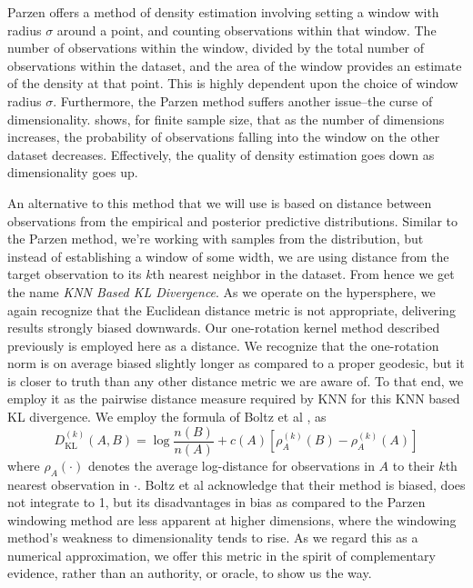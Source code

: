 Parzen \cite{parzen1962} offers a method of density estimation involving setting a window with
  radius $\sigma$ around a point, and counting observations within that window.  The number of
  observations within the window, divided by the total number of observations within the dataset,
  and the area of the window provides an estimate of the density at that point. This is highly
  dependent upon the choice of window radius $\sigma$.  Furthermore, the Parzen method suffers
  another issue--the curse of dimensionality.  \cite{boltz2009} shows, for finite sample size, that
  as the number of dimensions increases, the probability of observations falling into the window on
  the other dataset decreases. Effectively, the quality of density estimation goes down as
  dimensionality goes up.

An alternative to this method that we will use is based on distance between observations from the
  empirical and posterior predictive distributions.  Similar to the Parzen method, we're working
  with samples from the distribution, but instead of establishing a window of some width, we are
  using distance from the target observation to its $k$th nearest neighbor in the dataset.
  From hence we get the name \emph{KNN Based KL Divergence}.  As we operate on the hypersphere,
  we again recognize that the Euclidean distance metric is not appropriate, delivering results strongly
  biased downwards.  Our one-rotation kernel method described previously is employed here as a
  distance.  We recognize that the one-rotation norm is on average biased slightly longer as
  compared to a proper geodesic, but it is closer to truth than any other distance metric we are
  aware of.  To that end, we employ it as the pairwise distance measure required by KNN for this KNN
  based KL divergence.  We employ the formula of Boltz et al \cite{boltz2009}, as
  \begin{equation}
    \label{eqn:knnkld}
    D_{\text{KL}}^{(k)}(A,B) = \log\frac{n(B)}{n(A)} + c(A) \left[\rho_A^{(k)}(B)
                                                                      - \rho_A^{(k)}(A)\right]
  \end{equation}
  where $\rho_A(\cdot)$ denotes the average log-distance for observations in $A$ to their $k$th
  nearest observation in $\cdot$.  Boltz et al acknowledge that their method is biased, does not
  integrate to 1, but its disadvantages in bias as compared to the Parzen windowing method are less
  apparent at higher dimensions, where the windowing method's weakness to dimensionality tends to
  rise.  As we regard this as a numerical approximation, we offer this metric in the spirit of
  complementary evidence, rather than an authority, or oracle, to show us the way.































